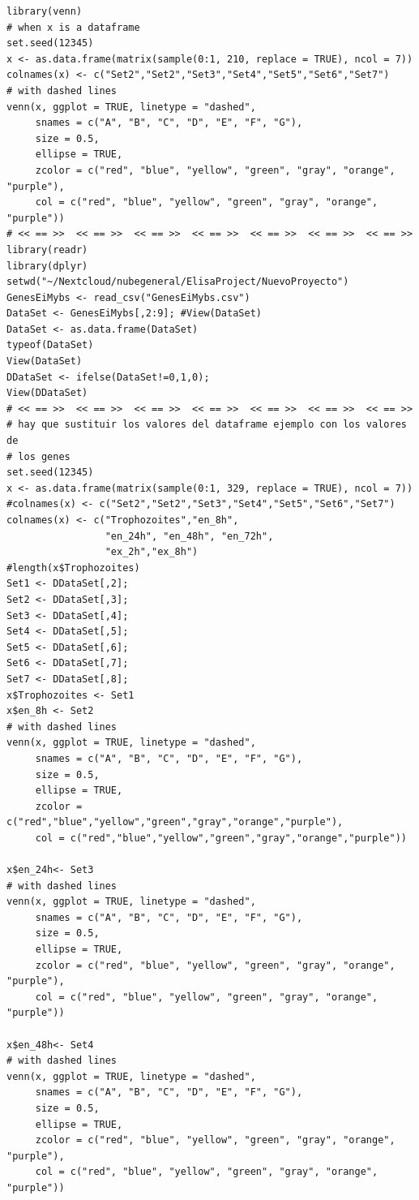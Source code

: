 \documentclass{article}
\begin{document}
\begin{verbatim}
library(venn)
# when x is a dataframe
set.seed(12345)
x <- as.data.frame(matrix(sample(0:1, 210, replace = TRUE), ncol = 7))
colnames(x) <- c("Set2","Set2","Set3","Set4","Set5","Set6","Set7")
# with dashed lines
venn(x, ggplot = TRUE, linetype = "dashed",
     snames = c("A", "B", "C", "D", "E", "F", "G"),
     size = 0.5,
     ellipse = TRUE,
     zcolor = c("red", "blue", "yellow", "green", "gray", "orange", "purple"),
     col = c("red", "blue", "yellow", "green", "gray", "orange", "purple"))
# << == >>  << == >>  << == >>  << == >>  << == >>  << == >>  << == >> 
library(readr)
library(dplyr)
setwd("~/Nextcloud/nubegeneral/ElisaProject/NuevoProyecto")
GenesEiMybs <- read_csv("GenesEiMybs.csv")
DataSet <- GenesEiMybs[,2:9]; #View(DataSet)
DataSet <- as.data.frame(DataSet)
typeof(DataSet)
View(DataSet)
DDataSet <- ifelse(DataSet!=0,1,0); 
View(DDataSet)
# << == >>  << == >>  << == >>  << == >>  << == >>  << == >>  << == >> 
# hay que sustituir los valores del dataframe ejemplo con los valores de
# los genes
set.seed(12345)
x <- as.data.frame(matrix(sample(0:1, 329, replace = TRUE), ncol = 7))
#colnames(x) <- c("Set2","Set2","Set3","Set4","Set5","Set6","Set7")
colnames(x) <- c("Trophozoites","en_8h",
                 "en_24h", "en_48h", "en_72h",
                 "ex_2h","ex_8h")
#length(x$Trophozoites)
Set1 <- DDataSet[,2]; 
Set2 <- DDataSet[,3]; 
Set3 <- DDataSet[,4]; 
Set4 <- DDataSet[,5]; 
Set5 <- DDataSet[,6]; 
Set6 <- DDataSet[,7]; 
Set7 <- DDataSet[,8]; 
x$Trophozoites <- Set1
x$en_8h <- Set2
# with dashed lines
venn(x, ggplot = TRUE, linetype = "dashed",
     snames = c("A", "B", "C", "D", "E", "F", "G"),
     size = 0.5,
     ellipse = TRUE,
     zcolor = c("red","blue","yellow","green","gray","orange","purple"),
     col = c("red","blue","yellow","green","gray","orange","purple"))

x$en_24h<- Set3
# with dashed lines
venn(x, ggplot = TRUE, linetype = "dashed",
     snames = c("A", "B", "C", "D", "E", "F", "G"),
     size = 0.5,
     ellipse = TRUE,
     zcolor = c("red", "blue", "yellow", "green", "gray", "orange", "purple"),
     col = c("red", "blue", "yellow", "green", "gray", "orange", "purple"))

x$en_48h<- Set4
# with dashed lines
venn(x, ggplot = TRUE, linetype = "dashed",
     snames = c("A", "B", "C", "D", "E", "F", "G"),
     size = 0.5,
     ellipse = TRUE,
     zcolor = c("red", "blue", "yellow", "green", "gray", "orange", "purple"),
     col = c("red", "blue", "yellow", "green", "gray", "orange", "purple"))


\end{verbatim}
\end{document}
